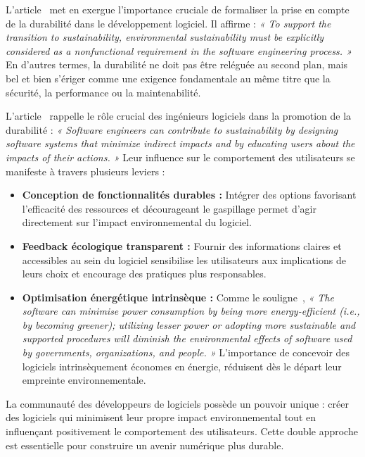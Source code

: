 L'article~\cite{SafetySecuritySustainability} met en exergue l'importance cruciale de formaliser la prise en compte de la durabilité dans le développement logiciel. Il affirme : \emph{« To support the transition to sustainability, environmental sustainability must be explicitly considered as a nonfunctional requirement in the software engineering process. »} En d'autres termes, la durabilité ne doit pas être reléguée au second plan, mais bel et bien s'ériger comme une exigence fondamentale au même titre que la sécurité, la performance ou la maintenabilité.


L'article~\cite{SafetySecuritySustainability} rappelle le rôle crucial des ingénieurs logiciels dans la promotion de la durabilité : \emph{« Software engineers can contribute to sustainability by designing software systems that minimize indirect impacts and by educating users about the impacts of their actions. »} Leur influence sur le comportement des utilisateurs se manifeste à travers plusieurs leviers :
\begin{itemize}
    \item \textbf{Conception de fonctionnalités durables :} Intégrer des options favorisant l'efficacité des ressources et décourageant le gaspillage permet d'agir directement sur l'impact environnemental du logiciel.
    \item \textbf{Feedback écologique transparent :} Fournir des informations claires et accessibles au sein du logiciel sensibilise les utilisateurs aux implications de leurs choix et encourage des pratiques plus responsables.
    \item \textbf{Optimisation énergétique intrinsèque :} Comme le souligne~\cite{GreenMeasurementStructure}, \emph{« The software can minimise power consumption by being more energy-efficient (i.e., by becoming greener); utilizing lesser power or adopting more sustainable and supported procedures will diminish the environmental effects of software used by governments, organizations, and people. »} L’importance de concevoir des logiciels intrinsèquement économes en énergie, réduisent dès le départ leur empreinte environnementale.
\end{itemize}


La communauté des développeurs de logiciels possède un pouvoir unique : créer des logiciels qui minimisent leur propre impact environnemental tout en influençant positivement le comportement des utilisateurs. Cette double approche est essentielle pour construire un avenir numérique plus durable.


